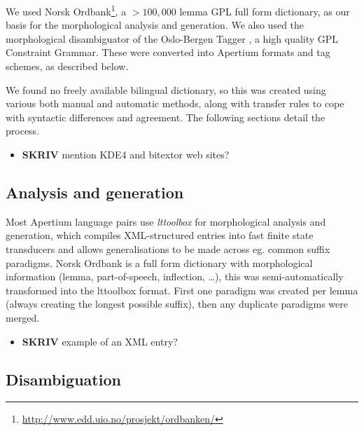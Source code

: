 \documentclass[11pt]{article}
\begin{document}
We used Norsk Ordbank\footnote{\href{http://www.edd.uio.no/prosjekt/ordbanken/}{http://www.edd.uio.no/prosjekt/ordbanken/} }, a $>100,000$ lemma GPL full form
dictionary, as our basis for the morphological analysis and
generation. We also used the morphological disambiguator of the
Oslo-Bergen Tagger \citep{hagen2000cbt}, a high quality GPL Constraint
Grammar. These were converted into Apertium formats and tag schemes,
as described below.

We found no freely available bilingual dictionary, so this was created
using various both manual and automatic methods, along with transfer
rules to cope with syntactic differences and agreement. The following
sections detail the process.
\begin{itemize}

\item \textbf{SKRIV} mention KDE4 and bitextor web sites?\\
\label{sec-3.1.1}

\end{itemize} %
\subsection{Analysis and generation}
\label{sec-3.2}

Most Apertium language pairs use \emph{lttoolbox} for morphological
analysis and generation, which compiles XML-structured entries into
fast finite state transducers and allows generalisations to be made
across eg. common suffix paradigms. Norsk Ordbank is a full form
dictionary with morphological information (lemma, part-of-speech,
inflection, \ldots{}), this was semi-automatically transformed into the
lttoolbox format. First one paradigm was created per lemma (always
creating the longest possible suffix), then any duplicate paradigms
were merged.
\begin{itemize}

\item \textbf{SKRIV} example of an XML entry?\\
\label{sec-3.2.1}

\end{itemize} %
\subsection{Disambiguation}
\label{sec-3.3}
\end{document}
